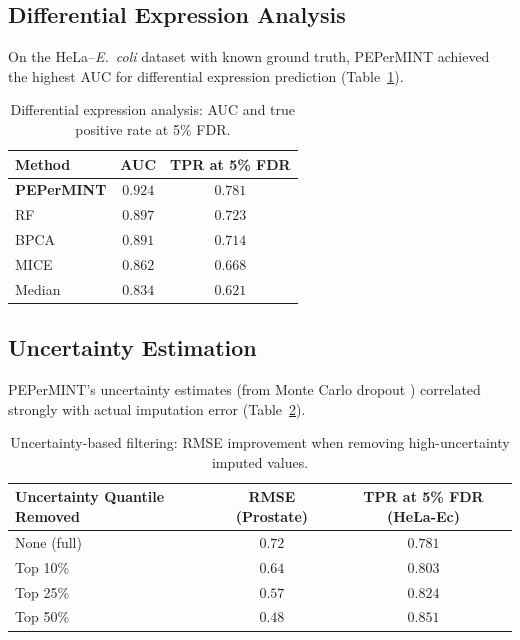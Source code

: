 \documentclass[11pt]{article}
\begin{document}
\subsection{Differential Expression Analysis}

On the HeLa--\textit{E.\ coli} dataset with known ground truth, PEPerMINT achieved the highest AUC for differential expression prediction (Table~\ref{tab:de}).

\begin{table}[H]
\centering
\caption{Differential expression analysis: AUC and true positive rate at 5\% FDR.}
\label{tab:de}
\begin{tabular}{@{}lcc@{}}
\toprule
Method & AUC & TPR at 5\% FDR \\
\midrule
\textbf{PEPerMINT} & $\mathbf{0.924}$ & $\mathbf{0.781}$ \\
RF & $0.897$ & $0.723$ \\
BPCA & $0.891$ & $0.714$ \\
MICE & $0.862$ & $0.668$ \\
Median & $0.834$ & $0.621$ \\
\bottomrule
\end{tabular}
\end{table}

\subsection{Uncertainty Estimation}

PEPerMINT's uncertainty estimates (from Monte Carlo dropout \citep{gal2016dropout}) correlated strongly with actual imputation error (Table~\ref{tab:uncertainty}).

\begin{table}[H]
\centering
\caption{Uncertainty-based filtering: RMSE improvement when removing high-uncertainty imputed values.}
\label{tab:uncertainty}
\begin{tabular}{@{}lcc@{}}
\toprule
Uncertainty Quantile Removed & RMSE (Prostate) & TPR at 5\% FDR (HeLa-Ec) \\
\midrule
None (full) & $0.72$ & $0.781$ \\
Top 10\% & $0.64$ & $0.803$ \\
Top 25\% & $0.57$ & $0.824$ \\
Top 50\% & $\mathbf{0.48}$ & $\mathbf{0.851}$ \\
\bottomrule
\end{tabular}
\end{table}
\end{document}
